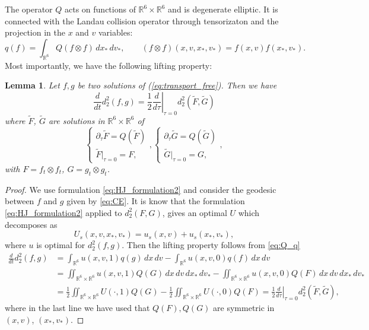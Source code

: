 \documentclass[10pt,oneside]{amsart}
\numberwithin{equation}{section}
\numberwithin{definition}{section}
\numberwithin{theorem}{section}
\newtheorem{lemma}{Lemma}
\numberwithin{lemma}{section}
\begin{document}
%
The operator $Q$ acts on functions of $\mathbb R^6\times \mathbb R^6$ and is degenerate elliptic. It is connected with the Landau collision operator through tensorizaton and the projection in the $x$ and $v$ variables:
%
\begin{equation}\label{eq:Q_q}
  q(f)=\int_{\mathbb{R}^{6}}Q(f\otimes f)\,dx_*\,dv_*,\qquad(f\otimes f)(x,v,x_*,v_*)=f(x,v)f(x_*,v_*).
\end{equation}
%
Most importantly, we have the following lifting property:
% 
\begin{lemma}\label{lem:lifting_fuzzy}
  Let $f,g$ be two solutions of (\ref{eq:transport_free}). Then we have
  \begin{equation*}
    \frac{d}{dt}d_2^2(f,g) = \frac{1}{2} \left.\frac{d}{d\tau}\right|_{\tau = 0} d_2^2(\tilde F,\tilde G)
  \end{equation*}
  where $\tilde F$, $\tilde G$ are solutions in $\mathbb R^6 \times \mathbb R^6$ of 
  \begin{equation*}
    \begin{cases}
      \partial_{\tau}\tilde{F}=Q(\tilde{F})\\
      \tilde{F}|_{\tau=0}=F,
    \end{cases},\begin{cases}
      \partial_{\tau}\tilde{G}=Q(\tilde{G})\\
      \tilde{G}|_{\tau=0}=G,
    \end{cases},
  \end{equation*}
  with $F = f_t\otimes f_t$, $G = g_t\otimes g_t$.
\end{lemma}
% 
\begin{proof}
  We use formulation \cref{eq:HJ_formulation2} and consider the geodesic between $f$ and $g$ given by \cref{eq:CE}. It is know that the formulation \cref{eq:HJ_formulation2} applied to $d_2^2(F,G)$, gives an optimal $U$ which decomposes as
  \begin{equation*}
    U_s(x,v,x_*,v_*)=u_s(x,v)+u_s(x_*,v_*),
  \end{equation*}
  where $u$ is optimal for $d_2^2(f,g)$. Then the lifting property follows from \cref{eq:Q_q}
  \begin{align*}
    \frac{d}{dt}d_2^2(f,g)  
    & =\int_{\mathbb{R}^{6}}u(x,v,1)q(g)\,dx\,dv-\int_{\mathbb{R}^{6}}u(x,v,0)q(f)\,dx\,dv\\
    & =\iint_{\mathbb{R}^{6}\times \mathbb{R}^{6}}u(x,v,1)Q(G)\,dx\,dv\,dx_*\,dv_*
    -\iint_{\mathbb{R}^{6}\times \mathbb{R}^{6}}u(x,v,0)Q(F)\,dx\,dv\,dx_*\,dv_*\\
    &=\frac{1}{2}\iint_{\mathbb{R}^{6}\times \mathbb{R}^{6}}U(\cdot,1)Q(G)-\frac{1}{2}\iint_{\mathbb{R}^{6}\times \mathbb{R}^{6}}U(\cdot,0)Q(F)
    =\frac{1}{2} \left.\frac{d}{d\tau}\right|_{\tau = 0} d_2^2(\tilde F,\tilde G),
  \end{align*}
  where in the last line we have used that $Q(F),Q(G)$ are symmetric in $(x,v)$, $(x_*,v_*)$.
\end{proof}
\end{document}
